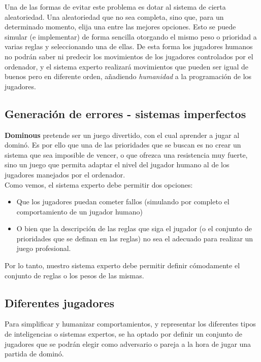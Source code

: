 Una de las formas de evitar este problema es dotar al sistema de cierta aleatoriedad. Una aleatoriedad que no sea completa,
sino que, para un determinado momento, elija una entre las mejores opciones. Esto se puede simular (e implementar) de forma
sencilla otorgando el mismo peso o prioridad a varias reglas y seleccionando una de ellas. De esta forma los jugadores
humanos no podrán saber ni predecir los movimientos de los jugadores controlados por el ordenador, y el sistema experto
realizará movimientos que pueden ser igual de buenos pero en diferente orden, añadiendo \emph{humanidad} a la programación
de los jugadores.

\subsection{Generación de errores - sistemas imperfectos}

\textbf{Dominous} pretende ser un juego divertido, con el cual aprender a jugar al dominó. Es por ello que una de las
prioridades que se buscan es no crear un sistema que sea imposible de vencer, o que ofrezca una resistencia muy fuerte,
sino un juego que permita adaptar el nivel del jugador humano al de los jugadores manejados por el ordenador. \\

Como vemos, el sistema experto debe permitir dos opciones:
\begin{itemize}
    \item Que los jugadores puedan cometer fallos (simulando por completo el comportamiento de un jugador humano)
    \item O bien que la descripción de las reglas que siga el jugador (o el conjunto de prioridades que se definan
            en las reglas) no sea el adecuado para realizar un juego profesional.
\end{itemize}

Por lo tanto, nuestro sistema experto debe permitir definir cómodamente el conjunto de reglas o los pesos de las mismas.

\subsection{Diferentes jugadores}

Para simplificar y humanizar comportamientos, y representar los diferentes tipos de inteligencias o sistemas expertos,
se ha optado por definir un conjunto de jugadores que se podrán elegir como adversario o pareja a la hora de jugar
una partida de dominó.

